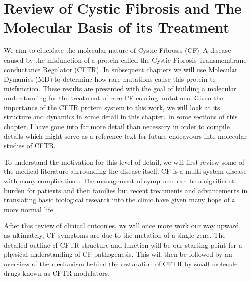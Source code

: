 \chapter{Review of Cystic Fibrosis and The Molecular Basis of its Treatment}
\label{chap:cftr}
\newpage





We aim to elucidate the molecular nature of Cystic Fibrosis (CF)--A disease caused by the misfunction of a protein called the Cystic Fibrosis Transmembrane conductance Regulator (CFTR). In subsequent chapters we will use Molecular Dynamics (MD) to determine how rare mutations cause 
this protein to misfunction. These results are presented with the goal of building a molecular understanding for the treatment of rare CF causing mutations. Given the importance of the CFTR protein system to this work, we will look at its structure and dynamics in some detail in this chapter. In some sections of this chapter, I have gone into far more detail than necessary in order to compile details which might serve as a reference text for future endeavours into molecular studies of CFTR. 

To understand the motivation for this level of detail, we will first review some of the medical literature surrounding the disease itself. CF is a multi-system disease with many complications. The management of symptoms can be a significant burden for patients and their families but recent treatments and advancements in translating basic biological research into the clinic have given many hope of a more normal life. 

After this review of clinical outcomes, we will once more work our way upward, as ultimately, CF symptoms are due to the mutation of a single gene. The detailed outline of CFTR structure and function will be our starting point for a physical understanding of CF pathogenesis. This will then be followed by an overview of the mechanism behind the restoration of CFTR by small molecule drugs known as CFTR modulators. 

